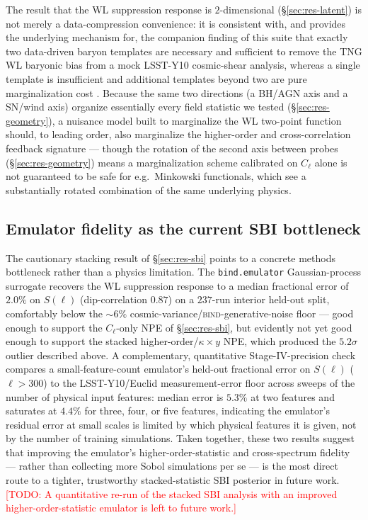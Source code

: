 \documentclass[11pt]{article}
\newcommand{\bind}{\textsc{bind}}
\newcommand{\Sell}{S(\ell)}                    %
\newcommand{\kappay}{\kappa\times y}
\newcommand{\todo}[1]{\textcolor{red}{[TODO: #1]}}
\begin{document}
The result that the WL suppression response is $2$-dimensional
(\S\ref{sec:res-latent}) is not merely a data-compression convenience: it
is consistent with, and provides the underlying mechanism for, the
companion finding of this suite that exactly two data-driven baryon
templates are necessary and sufficient to remove the TNG WL baryonic bias
from a mock LSST-Y10 cosmic-shear analysis, whereas a single template is
insufficient and additional templates beyond two are pure marginalization
cost \citep[Paper~II, in prep]{bindII}. Because the same two directions
(a BH/AGN axis and a SN/wind axis) organize essentially every field
statistic we tested (\S\ref{sec:res-geometry}), a nuisance model built to
marginalize the WL two-point function should, to leading order, also
marginalize the higher-order and cross-correlation feedback signature —
though the rotation of the second axis between probes
(\S\ref{sec:res-geometry}) means a marginalization scheme calibrated on
$C_\ell$ alone is not guaranteed to be safe for e.g.\ Minkowski
functionals, which see a substantially rotated combination of the same
underlying physics.

\subsection{Emulator fidelity as the current SBI bottleneck}

The cautionary stacking result of \S\ref{sec:res-sbi} points to a concrete
methods bottleneck rather than a physics limitation. The \texttt{bind.emulator}
Gaussian-process surrogate recovers the WL suppression response to a
median fractional error of $2.0\%$ on $\Sell$ (dip-correlation $0.87$) on
a $237$-run interior held-out split, comfortably below the $\sim\!6\%$
cosmic-variance/\bind{}-generative-noise floor — good enough to support
the $C_\ell$-only NPE of \S\ref{sec:res-sbi}, but evidently not yet good
enough to support the stacked higher-order/$\kappay$ NPE, which produced
the $5.2\sigma$ outlier described above. %
A complementary, quantitative Stage-IV-precision check compares a
small-feature-count emulator's held-out fractional error on $\Sell$
($\ell>300$) to the LSST-Y10/Euclid measurement-error floor across sweeps
of the number of physical input features: median error is $5.3\%$ at two
features and saturates at $4.4\%$ for three, four, or five features,
indicating the emulator's residual error at small scales is limited by
which physical features it is given, not by the number of training
simulations. %
Taken together, these two results suggest that improving the emulator's
higher-order-statistic and cross-spectrum fidelity — rather than
collecting more Sobol simulations per se — is the most direct route to a
tighter, trustworthy stacked-statistic SBI posterior in future work.
\todo{A quantitative re-run of the stacked SBI analysis with an improved
higher-order-statistic emulator is left to future work.}
\end{document}
